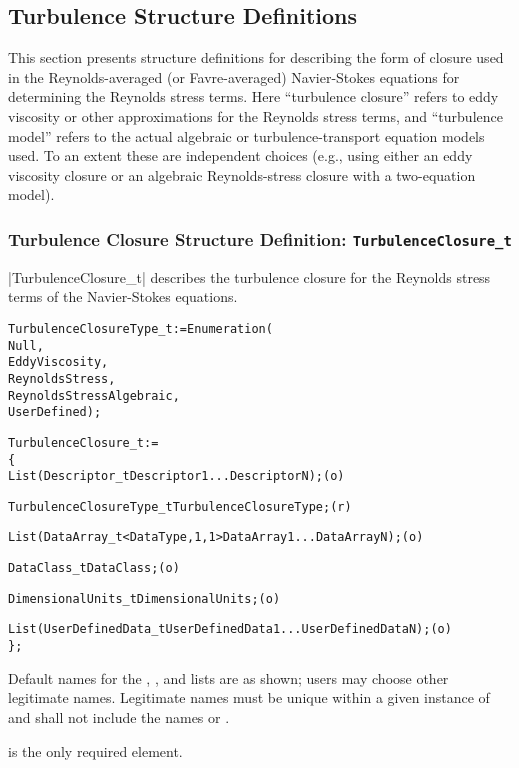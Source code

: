 \subsection{Turbulence Structure Definitions}

This section presents structure definitions for describing the form of
closure used in the Reynolds-averaged (or Favre-averaged) Navier-Stokes
equations for determining the Reynolds stress terms.  Here ``turbulence
closure'' refers to eddy viscosity or other approximations for the
Reynolds stress terms, and ``turbulence model'' refers to the actual
algebraic or turbulence-transport equation models used.  To an extent
these are independent choices (e.g., using either an eddy viscosity
closure or an algebraic Reynolds-stress closure with a two-equation
model).

\subsubsection{Turbulence Closure Structure Definition: \texttt{TurbulenceClosure\_t}}

|TurbulenceClosure_t| describes the turbulence closure for the Reynolds
stress terms of the Navier-Stokes equations.

\begin{alltt}
  TurbulenceClosureType\_t := Enumeration(
    Null,
    EddyViscosity,
    ReynoldsStress,                     
    ReynoldsStressAlgebraic,
    UserDefined ) ;

  TurbulenceClosure\_t :=
    \{
    List( Descriptor\_t Descriptor1 ... DescriptorN ) ;                      (o)

    TurbulenceClosureType\_t TurbulenceClosureType ;                         (r)
    
    List( DataArray\_t<DataType, 1, 1> DataArray1 ... DataArrayN ) ;         (o)

    DataClass\_t DataClass ;                                                 (o)
                
    DimensionalUnits\_t DimensionalUnits ;                                   (o)

    List( UserDefinedData\_t UserDefinedData1 ... UserDefinedDataN ) ;       (o)
    \} ;
\end{alltt}

\begin{notes}
\item
 Default names for the , , and
 lists are as shown; users may choose other legitimate names.
 Legitimate names must be unique within a given instance of
  and shall not include the names
  or .
\item
  is the only required element.
\end{notes}


